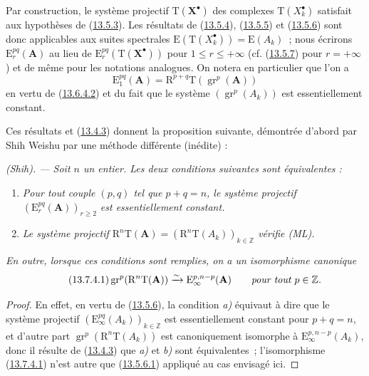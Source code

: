 \begin{env}[13.7.3]
\label{0.13.7.3-fr}
Par construction, le système projectif $\mathrm T(\mathbf X^\bullet)$
des complexes $\mathrm T(X_k^\bullet)$ satisfait aux hypothèses de
(\hyperref[0.13.5.3-fr]{13.5.3}). Les résultats de
(\hyperref[0.13.5.4-fr]{13.5.4}),
(\hyperref[0.13.5.5-fr]{13.5.5}) et
(\hyperref[0.13.5.6-fr]{13.5.6}) sont donc applicables aux suites
spectrales $\mathrm E(\mathrm T(X_k^\bullet))=\mathrm E(A_k)$~; nous
écrirons $\mathrm E_r^{pq}(\mathbf A)$ au lieu de
$\mathrm E_r^{pq}(\mathrm T(\mathbf X^\bullet))$ pour
$1\leq r\leq+\infty$ (cf. (\hyperref[0.13.5.7-fr]{13.5.7}) pour
$r=+\infty$) et de même pour les notations analogues. On notera en
particulier que l'on a
\begin{equation}
\label{0.13.7.3.1-fr}
\tag{13.7.3.1}
\mathrm E_1^{pq}(\mathbf A)=
\mathrm R^{p+q}\mathrm T(\operatorname{gr}^p(\mathbf A))
\end{equation}
en vertu de (\hyperref[0.13.6.4.2-fr]{13.6.4.2}) et du fait que le
système $(\operatorname{gr}^p(A_k))$ est essentiellement constant.

Ces résultats et (\hyperref[0.13.4.3-fr]{13.4.3}) donnent la proposition
suivante, démontrée d'abord par Shih Weishu par une méthode différente
(inédite) :
\end{env}

\begin{proposition}[13.7.4]
\label{0.13.7.4-fr}
\emph{(Shih). --- Soit $n$ un entier. Les deux conditions suivantes sont
équivalentes :}
\begin{enumerate}
\item[\emph{a)}] \emph{Pour tout couple $(p,q)$ tel que $p+q=n$, le
système projectif $(\mathrm E_r^{pq}(\mathbf A))_{r\geq2}$ est
essentiellement constant.}
\item[\emph{b)}] \emph{Le système projectif
$\mathrm R^n\mathrm T(\mathbf A)=
(\mathrm R^n\mathrm T(A_k))_{k\in\mathbb Z}$ vérifie (ML).}
\end{enumerate}
\emph{En outre, lorsque ces conditions sont remplies, on a un
isomorphisme canonique}
\begin{equation}
\label{0.13.7.4.1-fr}
\tag{13.7.4.1}
\operatorname{gr}^p(\mathrm R^n\mathrm T(\mathbf A))
\xrightarrow{\sim}\mathrm E_\infty^{p,n-p}(\mathbf A)
\qquad\emph{pour tout $p\in\mathbb Z$.}
\end{equation}
\end{proposition}
\begin{proof}
En effet, en vertu de (\hyperref[0.13.5.6-fr]{13.5.6}), la condition
\emph{a)} équivaut à dire que le système projectif
$(\mathrm E_\infty^{pq}(A_k))_{k\in\mathbb Z}$ est essentiellement
constant pour $p+q=n$, et d'autre part
$\operatorname{gr}^p(\mathrm R^n\mathrm T(A_k))$ est canoniquement
isomorphe à $\mathrm E_\infty^{p,n-p}(A_k)$, donc il résulte de
(\hyperref[0.13.4.3-fr]{13.4.3}) que \emph{a)} et \emph{b)} sont
équivalentes~; l'isomorphisme
(\hyperref[0.13.7.4.1-fr]{13.7.4.1}) n'est autre que
(\hyperref[0.13.5.6.1-fr]{13.5.6.1}) appliqué au cas envisagé ici.
\end{proof}

